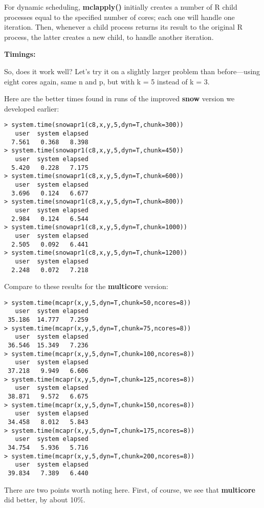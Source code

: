 For dynamic scheduling, {\bf mclapply()} initially creates a number of R
child processes equal to the specified number of cores; each one will
handle one iteration.  Then, whenever a child process returns its result
to the original R process, the latter creates a new child, to handle
another iteration.

{\bf Timings:}

So, does it work well?  Let's try it on a slightly larger problem than
before---using eight cores again, same n and p, but with k = 5 instead
of k = 3.

Here are the better times found in runs of the improved {\bf snow}
version we developed earlier:

\begin{Verbatim}[fontsize=\relsize{-2}]
> system.time(snowapr1(c8,x,y,5,dyn=T,chunk=300))
   user  system elapsed
  7.561   0.368   8.398
> system.time(snowapr1(c8,x,y,5,dyn=T,chunk=450))
   user  system elapsed
  5.420   0.228   7.175
> system.time(snowapr1(c8,x,y,5,dyn=T,chunk=600))
   user  system elapsed
  3.696   0.124   6.677
> system.time(snowapr1(c8,x,y,5,dyn=T,chunk=800))
   user  system elapsed
  2.984   0.124   6.544
> system.time(snowapr1(c8,x,y,5,dyn=T,chunk=1000))
   user  system elapsed 
  2.505   0.092   6.441
> system.time(snowapr1(c8,x,y,5,dyn=T,chunk=1200))
   user  system elapsed 
  2.248   0.072   7.218
\end{Verbatim}

Compare to these results for the {\bf multicore} version:

\begin{Verbatim}[fontsize=\relsize{-2}]
> system.time(mcapr(x,y,5,dyn=T,chunk=50,ncores=8))
   user  system elapsed
 35.186  14.777   7.259
> system.time(mcapr(x,y,5,dyn=T,chunk=75,ncores=8))
   user  system elapsed
 36.546  15.349   7.236
> system.time(mcapr(x,y,5,dyn=T,chunk=100,ncores=8))
   user  system elapsed
 37.218   9.949   6.606
> system.time(mcapr(x,y,5,dyn=T,chunk=125,ncores=8))
   user  system elapsed
 38.871   9.572   6.675
> system.time(mcapr(x,y,5,dyn=T,chunk=150,ncores=8))
   user  system elapsed
 34.458   8.012   5.843
> system.time(mcapr(x,y,5,dyn=T,chunk=175,ncores=8))
   user  system elapsed
 34.754   5.936   5.716
> system.time(mcapr(x,y,5,dyn=T,chunk=200,ncores=8))
   user  system elapsed
 39.834   7.389   6.440
\end{Verbatim}

There are two points worth noting here.  First, of course, we see that
{\bf multicore} did better, by about 10\%.

